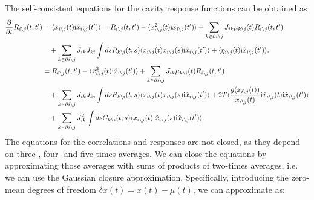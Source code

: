 \documentclass[
    preprint,
    linenumbers,
    amsmath,amssymb,amsfonts,
    aps, physrev,
    superscriptaddress,
    10pt,
    bibnotes
    ]{revtex4-2}
\begin{document}
The self-consistent equations for the cavity response functions can be obtained as
\begin{subequations}
  \begin{align}
    \frac{\partial}{\partial t}R_{i\setminus j}(t,t') & = \langle \dot{x}_{i\setminus j}(t){\rm i}\hat{x}_{i\setminus j}(t')\rangle = R_{i\setminus j}(t,t') - \langle x_{i\setminus j}^2(t){\rm i}\hat{x}_{i\setminus j}(t') \rangle + \sum_{k\in\partial i \setminus j}J_{ik}\mu_{k\setminus i}(t)R_{i\setminus j}(t,t') \nonumber\\
    &\quad + \sum_{k\in \partial i \setminus j} J_{ik}J_{ki} \int ds R_{k\setminus i}(t,s) \langle x_{i\setminus j}(t) x_{i\setminus j}(s) {\rm i}\hat{x}_{i\setminus j}(t') \rangle + \langle\eta_{i\setminus j}(t){\rm i}\hat{x}_{i\setminus j}(t') \rangle.\\
    & = R_{i\setminus j}(t,t') - \langle x_{i\setminus j}^2(t){\rm i}\hat{x}_{i\setminus j}(t') \rangle + \sum_{k\in\partial i \setminus j}J_{ik}\mu_{k\setminus i}(t)R_{i\setminus j}(t,t') \nonumber\\
    &\quad + \sum_{k\in \partial i \setminus j} J_{ik}J_{ki} \int ds R_{k\setminus i}(t,s) \langle x_{i\setminus j}(t) x_{i\setminus j}(s) {\rm i}\hat{x}_{i\setminus j}(t') \rangle + 2T \langle \frac{g(x_{i\setminus j}(t))}{x_{i\setminus j}(t)}{\rm i}\hat{x}_{i\setminus j}(t){\rm i} \hat{x}_{i\setminus j}(t') \rangle \nonumber\\
    &\quad + \sum_{k\in \partial i \setminus j} J_{ik}^2 \int ds C_{k\setminus i}(t,s) \langle x_{i \setminus j}(t) {\rm i} \hat{x}_{i \setminus j}(s) {\rm i} \hat{x}_{i \setminus j}(t') \rangle.
  \end{align}
\end{subequations}
The equations for the correlations and responses are not closed, as they depend on three-, four- and five-times averages. We can close the equations by approximating those averages with sums of products of two-times averages, i.e. we can use the Gaussian closure approximation.
Specifically, introducing the zero-mean degrees of freedom $\delta x(t) = x(t) - \mu(t)$, we can approximate as:
\end{document}

